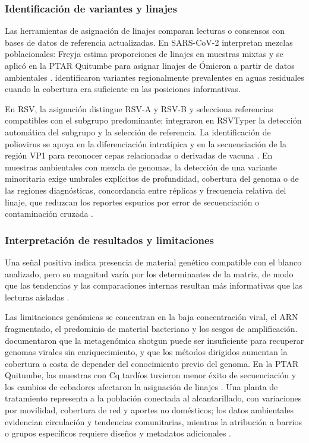 \subsubsection{Identificación de variantes y linajes}

Las herramientas de asignación de linajes comparan lecturas o consensos con bases de datos de referencia actualizadas. En SARS-CoV-2 interpretan mezclas poblacionales: Freyja estima proporciones de linajes en muestras mixtas \cite{Karthikeyan_2022} y se aplicó en la PTAR Quitumbe para asignar linajes de Ómicron a partir de datos ambientales \cite{MejiaCalle_2024}.  identificaron variantes regionalmente prevalentes en aguas residuales cuando la cobertura era suficiente en las posiciones informativas.

En RSV, la asignación distingue RSV-A y RSV-B y selecciona referencias compatibles con el subgrupo predominante;  integraron en RSVTyper la detección automática del subgrupo y la selección de referencia. La identificación de poliovirus se apoya en la diferenciación intratípica y en la secuenciación de la región VP1 para reconocer cepas relacionadas o derivadas de vacuna \cite{Asghar_2014,Klapsa_2022}. En muestras ambientales con mezcla de genomas, la detección de una variante minoritaria exige umbrales explícitos de profundidad, cobertura del genoma o de las regiones diagnósticas, concordancia entre réplicas y frecuencia relativa del linaje, que reduzcan los reportes espurios por error de secuenciación o contaminación cruzada \cite{Dash_2024,Child_2023}.

\subsubsection{Interpretación de resultados y limitaciones}

Una señal positiva indica presencia de material genético compatible con el blanco analizado, pero su magnitud varía por los determinantes de la matriz, de modo que las tendencias y las comparaciones internas resultan más informativas que las lecturas aisladas \cite{Parkins_2023,Hughes_2022}.

Las limitaciones genómicas se concentran en la baja concentración viral, el ARN fragmentado, el predominio de material bacteriano y los sesgos de amplificación.  documentaron que la metagenómica shotgun puede ser insuficiente para recuperar genomas virales sin enriquecimiento, y que los métodos dirigidos aumentan la cobertura a costa de depender del conocimiento previo del genoma. En la PTAR Quitumbe, las muestras con Cq tardíos tuvieron menor éxito de secuenciación y los cambios de cebadores afectaron la asignación de linajes \cite{MejiaCalle_2024}. Una planta de tratamiento representa a la población conectada al alcantarillado, con variaciones por movilidad, cobertura de red y aportes no domésticos; los datos ambientales evidencian circulación y tendencias comunitarias, mientras la atribución a barrios o grupos específicos requiere diseños y metadatos adicionales \cite{Parkins_2023,Sims_2020}.


